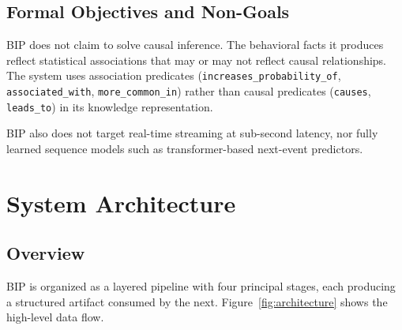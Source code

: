 \documentclass[12pt, a4paper]{article}
\begin{document}
\subsection{Formal Objectives and Non-Goals}

BIP does not claim to solve causal inference. The behavioral facts it produces reflect statistical associations that may or may not reflect causal relationships. The system uses association predicates (\texttt{increases\_probability\_of}, \texttt{associated\_with}, \texttt{more\_common\_in}) rather than causal predicates (\texttt{causes}, \texttt{leads\_to}) in its knowledge representation.

BIP also does not target real-time streaming at sub-second latency, nor fully learned sequence models such as transformer-based next-event predictors.

\section{System Architecture}
\label{sec:architecture}

\subsection{Overview}

BIP is organized as a layered pipeline with four principal stages, each producing a structured artifact consumed by the next. Figure~\ref{fig:architecture} shows the high-level data flow.
\end{document}
